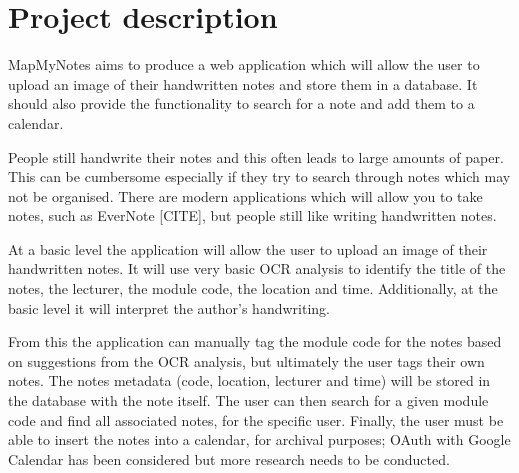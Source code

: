 \documentclass[11pt,fleqn,twoside]{article}
\begin{document}
\wordcount{}

\mmp

\setcounter{tocdepth}{3} %


\section{Project description}
MapMyNotes aims to produce a web application which will allow the user to upload an image of their handwritten notes and store them in a database. It should also provide the functionality to search for a note and add them to a calendar.

People still handwrite their notes and this often leads to large amounts of paper. This can be cumbersome especially if they try to search through notes which may not be organised. There are modern applications which will allow you to take notes, such as EverNote [CITE], but people still like writing handwritten notes.

At a basic level the application will allow the user to upload an image of their handwritten notes. It will use very basic OCR analysis to identify the title of the notes, the lecturer, the module code, the location and time. Additionally, at the basic level it will interpret the author's handwriting.

From this the application can manually tag the module code for the notes based on suggestions from the OCR analysis, but ultimately the user tags their own notes. The notes metadata (code, location, lecturer and time) will be stored in the database with the note itself. The user can then search for a given module code and find all associated notes, for the specific user. Finally, the user must be able to insert the notes into a calendar, for archival purposes; OAuth with Google Calendar has been considered but more research needs to be conducted.
\end{document}
